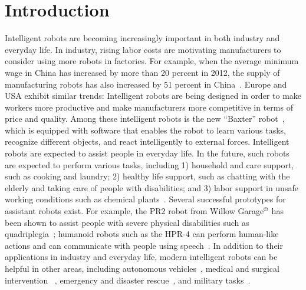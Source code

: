 \chapter{Introduction}
\label{chp:intro}
Intelligent robots are becoming increasingly important in both industry and everyday life. In industry, rising labor costs are motivating manufacturers to consider using more robots in factories. For example, when the average minimum wage in China has increased by more than 20 percent in 2012, the supply of manufacturing robots has also increased by 51 percent in China~\cite{IFR:report}. 
Europe and USA exhibit similar trends: Intelligent robots are being designed in order to make workers more productive and make manufacturers more competitive in terms of price and quality. Among these intelligent robots is the new ``Baxter'' robot~\cite{Brooks:2012:Baxter}, which is equipped with software that enables the robot to learn various tasks, recognize different objects, and react intelligently to external forces. Intelligent robots are expected to assist people in everyday life. In the future, such robots are expected to perform various tasks, including 1) household and care support, such as cooking and laundry; 2) healthy life support, such as chatting with the elderly and taking care of people with disabilities; and 3) labor support in unsafe working conditions such as chemical plants~\cite{Yamazaki:2012}. Several successful prototypes for assistant robots exist. For example, the PR2 robot from Willow Garage$^\copyright$ has been shown to assist people with severe physical disabilities such as quadriplegia~\cite{PR2HumanityWeb}; humanoid robots such as the HPR-4 can perform human-like actions and can communicate with people using speech~\cite{HRP-Cyber}. In addition to their applications in industry and everyday life, modern intelligent robots can be helpful in other areas, including autonomous vehicles~\cite{Montemerlo:2008:JSE}, medical and surgical intervention ~\cite{Bonfe:2012}, emergency and disaster rescue~\cite{Fukushima:2011}, and military tasks~\cite{AlphaDog:2012}.



